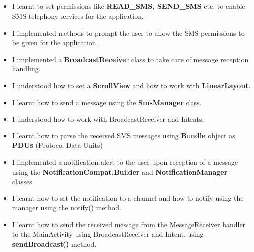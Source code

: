 \documentclass[12pt, a4]{article}
\begin{document}
\subsection*{}
\begin{itemize}

\item I learnt to set permissions like \textbf{READ\_SMS, SEND\_SMS} etc. to enable SMS telephony services for the application.
\item I implemented methods to prompt the user to allow the SMS permissions to be given for the application.
\item I implemented a \textbf{BroadcastReceiver} class to take care of message reception handling.
\item I understood how to set a \textbf{ScrollView} and how to work with \textbf{LinearLayout}.
\item I learnt how to send a message using the \textbf{SmsManager} class.
\item I understood how to work with BroadcastReceiver and Intents. \item I learnt how to parse the received SMS messages using \textbf{Bundle} object as \textbf{PDUs} (Protocol Data Units)
\item I implemented a notification alert to the user upon reception of a message using the \textbf{NotificationCompat.Builder} and \textbf{NotificationManager} classes.
\item I learnt how to set the notification to a channel and how to notify using the manager using the notify() method.
\item I learnt how to send the received message from the MessageReceiver handler to the MainActivity using BroadcastReceiver and Intent, using \textbf{sendBroadcast()} method.
\end{itemize}
\end{document}

